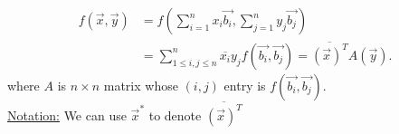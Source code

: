 \documentclass{report}
\begin{document}
    \begin{align*}
     f \left( \vec{ x} , \vec{ y}  \right) &= f \left( \sum\limits_{i=1}^{n} x_i \vec{ b_i} , \sum\limits_{j=1}^{n} y_j \vec{ b_j}  \right)\\
    &= \sum\limits_{1 \leq i , j \leq n}^{n} \overline{ x_i} y_j f \left( \vec{ b_i} , \vec{ b_j}  \right)= \overline{ \left( \vec{ x}  \right) ^{T} } A \left(\vec{ y}\right) 
    .\end{align*}
    where $ A$ is $n \times n$  matrix whose $ (i,j) $ entry is $ f \left( \vec{ b_i} , \vec{ b_j}  \right)$.\\
    \underline{Notation:} We can use $ \vec{ x} ^{*}$ to denote $ \overline{ \left( \vec{ x}  \right) ^{T}}$ \\
   
\end{document}
